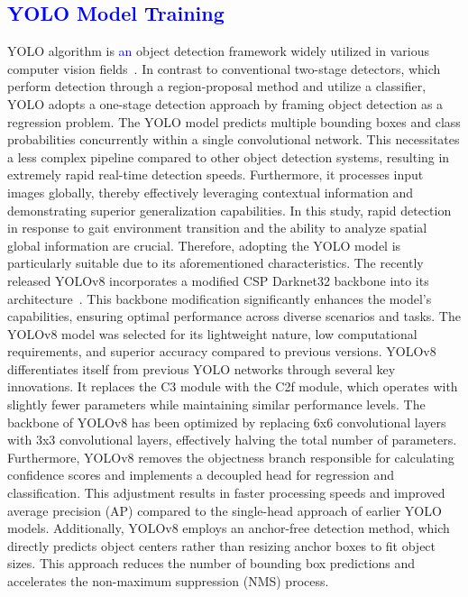 \documentclass[journal,article,submit,pdftex,moreauthors]{Definitions/mdpi}
\begin{document}
\subsection{\textcolor{blue}{YOLO Model Training}}
YOLO algorithm is \textcolor{blue}{an} object detection framework widely utilized in various computer vision fields~\cite{Redmon2016}. In contrast to conventional two-stage detectors, which perform detection through a region-proposal method and utilize a classifier, YOLO adopts a one-stage detection approach by framing object detection as a regression problem. The YOLO model predicts multiple bounding boxes and class probabilities concurrently within a single convolutional network. This necessitates a less complex pipeline compared to other object detection systems, resulting in extremely rapid real-time detection speeds. Furthermore, it processes input images globally, thereby effectively leveraging contextual information and demonstrating superior generalization capabilities. In this study, rapid detection in response to gait environment transition and the ability to analyze spatial global information are crucial. Therefore, adopting the YOLO model is particularly suitable due to its aforementioned characteristics.
The recently released YOLOv8 incorporates a modified CSP Darknet32 backbone into its architecture~\cite{Terven2023}. This backbone modification significantly enhances the model's capabilities, ensuring optimal performance across diverse scenarios and tasks. The YOLOv8 model was selected for its lightweight nature, low computational requirements, and superior accuracy compared to previous versions.
YOLOv8 differentiates itself from previous YOLO networks through several key innovations. It replaces the C3 module with the C2f module, which operates with slightly fewer parameters while maintaining similar performance levels. The backbone of YOLOv8 has been optimized by replacing 6x6 convolutional layers with 3x3 convolutional layers, effectively halving the total number of parameters. %
Furthermore, YOLOv8 removes the objectness branch responsible for calculating confidence scores and implements a decoupled head for regression and classification. This adjustment results in faster processing speeds and improved average precision (AP) compared to the single-head approach of earlier YOLO models. Additionally, YOLOv8 employs an anchor-free detection method, which directly predicts object centers rather than resizing anchor boxes to fit object sizes. This approach reduces the number of bounding box predictions and accelerates the non-maximum suppression (NMS) process.
\end{document}

